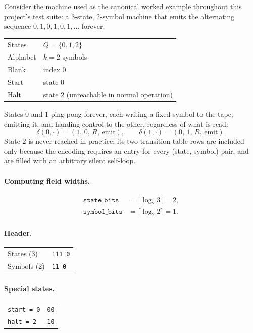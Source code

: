 \documentclass[11pt]{article}
\begin{document}
Consider the machine used as the canonical worked example throughout this project's test
suite: a 3-state, 2-symbol machine that emits the alternating sequence
$0,1,0,1,0,1,\ldots$ forever.
\begin{center}
\begin{tabular}{ll}
  \toprule
  States    & $Q = \{0, 1, 2\}$ \\
  Alphabet  & $k = 2$ symbols \\
  Blank     & index $0$ \\
  Start     & state $0$ \\
  Halt      & state $2$ (unreachable in normal operation) \\
  \bottomrule
\end{tabular}
\end{center}
States $0$ and $1$ ping-pong forever, each writing a fixed symbol to the tape, emitting it,
and handing control to the other, regardless of what is read:
\[
  \delta(0,\cdot) = (1,\,0,\,R,\,\text{emit}), \qquad
  \delta(1,\cdot) = (0,\,1,\,R,\,\text{emit}).
\]
State $2$ is never reached in practice; its two transition-table rows are included only
because the encoding requires an entry for every (state, symbol) pair, and are filled with
an arbitrary silent self-loop.

\paragraph{Computing field widths.}
\begin{align*}
  \texttt{state\_bits}  &= \lceil \log_2 3 \rceil = 2,\\
  \texttt{symbol\_bits} &= \lceil \log_2 2 \rceil = 1.
\end{align*}

\paragraph{Header.}
\begin{center}
\begin{tabular}{ll}
  States (3)   & \texttt{111 0} \\
  Symbols (2)  & \texttt{11 0} \\
\end{tabular}
\end{center}

\paragraph{Special states.}
\begin{center}
\begin{tabular}{ll}
  \texttt{start = 0}  & \texttt{00} \\
  \texttt{halt = 2}   & \texttt{10} \\
\end{tabular}
\end{center}
\end{document}
